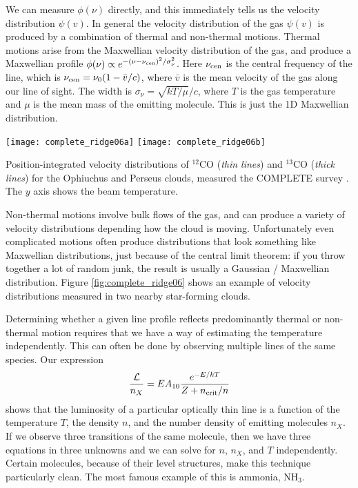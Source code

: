 We can measure $\phi(\nu)$ directly, and this immediately tells us the velocity distribution $\psi(v)$. In general the velocity distribution of the gas $\psi(v)$ is produced by a combination of thermal and non-thermal motions. Thermal motions arise from the Maxwellian velocity distribution of the gas, and produce a Maxwellian profile $\phi(\nu)\propto e^{-(\nu-\nu_{\rm cen})^2/\sigma_\nu^2}$. Here $\nu_{\rm cen}$ is the central frequency of the line, which is $\nu_{\rm cen} = \nu_0 (1 - \bar{v}/c)$, where $\bar{v}$ is the mean velocity of the gas along our line of sight. The width is $\sigma_\nu = \sqrt{kT/\mu}/c$, where $T$ is the gas temperature and $\mu$ is the mean mass of the emitting molecule. This is just the 1D Maxwellian distribution.

\begin{marginfigure}
\texttt{[image: complete\_ridge06a]}
\texttt{[image: complete\_ridge06b]}
\caption[COMPLETE spectra of Ophiuchus and Perseus]{
\label{fig:complete_ridge06}
Position-integrated velocity distributions of $^{12}$CO (\textit{thin lines}) and $^{13}$CO (\textit{thick lines}) for the Ophiuchus and Perseus clouds, measured the COMPLETE survey \citep{ridge06a}. The $y$ axis shows the beam temperature.
}
\end{marginfigure}

Non-thermal motions involve bulk flows of the gas, and can produce a variety of velocity distributions depending how the cloud is moving. Unfortunately even complicated motions often produce distributions that look something like Maxwellian distributions, just because of the central limit theorem: if you throw together a lot of random junk, the result is usually a Gaussian / Maxwellian distribution. Figure \ref{fig:complete_ridge06} shows an example of velocity distributions measured in two nearby star-forming clouds.

Determining whether a given line profile reflects predominantly thermal or non-thermal motion requires that we have a way of estimating the temperature independently. This can often be done by observing multiple lines of the same species. Our expression
\begin{equation}
\frac{\mathcal{L}}{n_X} = E A_{10} \frac{e^{-E/kT}}{Z + n_{\rm crit}/n}
\end{equation}
shows that the luminosity of a particular optically thin line is a function of the temperature $T$, the density $n$, and the number density of emitting molecules $n_X$. If we observe three transitions of the same molecule, then we have three equations in three unknowns and we can solve for $n$, $n_X$, and $T$ independently. Certain molecules, because of their level structures, make this technique particularly clean. The most famous example of this is ammonia, NH$_3$.

